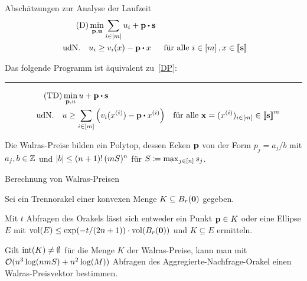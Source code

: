 \begin{frame}{Abschätzungen zur Analyse der Laufzeit}
	\pause
	\vspace{-1em}
	\begin{align*}
		\tag{D}
		&\min_{\fp,\fu} \sum_{i\in\first{m}} u_i + \fp \bcdot \fs \\
		\text{udN.} \quad &  u_i \geq v_i(x) - \fp \bcdot x & \text{für alle $i\in\first{m}, x\in\ffirst{\fs}$}
	\end{align*}
	\begin{lemma}
		Das folgende Programm ist äquivalent zu~\eqref{DP}:
		\vspace{5pt}
		\hrule
		\begin{align*}
		\tag{TD}\label{TDP}
		&\min_{\fp, u} u + \fp \bcdot \fs \\
		\text{udN.}\quad& u \geq \sum_{i\in\first{m}} \left( v_i(x^{(i)}) - \fp \bcdot x^{(i)} \right) & \text{für alle $\fx = (x^{(i)})_{i\in\first{m}}\in\ffirst{\fs}^m$}
		\end{align*}
	\end{lemma}
	\pause \begin{lemma}
		Die Walras-Preise bilden ein Polytop, dessen Ecken $\mathbf{p}$ von der Form $p_j=a_j/b$ mit $a_j,b\in\mathbb{Z}$ und $\lvert b\rvert\leq (n+1)!\, (mS)^n$ für $S\coloneqq\max_{j\in\left[ n \right]} s_j$.
	\end{lemma}
\end{frame}

\begin{frame}{Berechnung von Walras-Preisen}
	\begin{theorem}
		Sei ein Trennorakel einer konvexen Menge $K\subseteq B_r(\mathbf{0})$ gegeben.
		
		Mit $t$ Abfragen des Orakels lässt sich entweder ein Punkt $\mathbf{p}\in K$ oder eine Ellipse $E$ mit $\operatorname{vol}(E) \leq \exp(-t/(2n+1)) \cdot \operatorname{vol}(B_r(\mathbf{0}))$ und $K\subseteq E$ ermitteln.
	\end{theorem}
	\pause \begin{theorem}
		Gilt $\operatorname{int}(K)\neq \emptyset$ für die Menge $K$ der Walras-Preise, kann man mit $\mathcal{O}(n^3\log(nmS) + n^2\log(M))$ Abfragen des Aggregierte-Nachfrage-Orakel einen Walras-Preisvektor bestimmen.
	\end{theorem}
\end{frame}